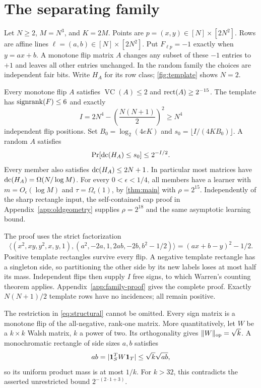 \section{The separating family}\label{sec:construction}
Let $N\ge2$, $M=N^3$, and $K=2M$. Points are $p=(x,y)\in[N]\times[2N^2]$. Rows are affine lines $\ell=(a,b)\in[N]\times[2N^2]$. Put $F_{\ell p}=-1$ exactly when $y=ax+b$. A monotone flip matrix $A$ changes any subset of these $-1$ entries to $+1$ and leaves all other entries unchanged. In the random family the choices are independent fair bits. Write $H_A$ for its row class; \cref{fig:template} shows $N=2$.




\begin{theorem}\label{thm:construction}
Every monotone flip $A$ satisfies $\operatorname{VC}(A)\le2$ and $\operatorname{rect}(A)\ge2^{-15}$. The template has $\operatorname{signrank}(F)\le6$ and exactly
\begin{equation}\label{eq:I}
 I=2N^4-\left(\frac{N(N+1)}2\right)^2\ge N^4
\end{equation}
independent flip positions. Set $B_0=\log_2(4eK)$ and $s_0=\lfloor I/(4KB_0)\rfloor$. A random $A$ satisfies
\[
 \Pr[\operatorname{dc}(H_A)\le s_0]\le2^{-I/2}.
\]
Every member also satisfies $\operatorname{dc}(H_A)\le2N+1$. In particular most matrices have $\operatorname{dc}(H_A)=\Omega(N/\log M)$. For every $0<\epsilon<1/4$, all members have a learner with $m=O_\epsilon(\log M)$ and $\tau=\Omega_\epsilon(1)$, by \cref{thm:main} with $\rho=2^{15}$. Independently of the sharp rectangle input, the self-contained cap proof in Appendix~\ref{app:oldgeometry} supplies $\rho=2^{18}$ and the same asymptotic learning bound.
\end{theorem}

The proof uses the strict factorization
\[
 \langle(x^2,xy,y^2,x,y,1),(a^2,-2a,1,2ab,-2b,b^2-1/2)\rangle
 =(ax+b-y)^2-1/2.
\]
Positive template rectangles survive every flip. A negative template rectangle has a singleton side, so partitioning the other side by its new labels loses at most half its mass. Independent flips then supply $I$ free signs, to which Warren's counting theorem applies. Appendix~\ref{app:family-proof} gives the complete proof. Exactly $N(N+1)/2$ template rows have no incidences; all remain positive.


The restriction in \eqref{eq:structural} cannot be omitted. Every sign matrix is a monotone flip of the all-negative, rank-one matrix. More quantitatively, let $W$ be a $k\times k$ Walsh matrix, $k$ a power of two. Its orthogonality gives $\|W\|_{\mathrm{op}}=\sqrt k$. A monochromatic rectangle of side sizes $a,b$ satisfies
\[
 ab=|\mathbf 1_S^TW\mathbf 1_T|\le\sqrt{k}\sqrt{ab},
\]
so its uniform product mass is at most $1/k$. For $k>32$, this contradicts the asserted unrestricted bound $2^{-(2\cdot1+3)}$.



